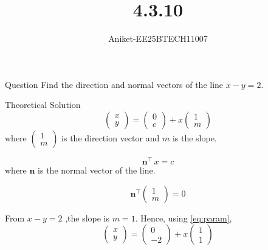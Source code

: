 \documentclass{beamer}
\title{4.3.10}
\author{Aniket-EE25BTECH11007}
\renewcommand{\vec}[1]{\mathbf{#1}}
\begin{document}
\frame{\titlepage}

\begin{frame}{Question}
Find the direction and normal vectors of the line \(x - y = 2\).
\end{frame}

\begin{frame}{Theoretical Solution}
\begin{equation}
\begin{pmatrix} x \\ y \end{pmatrix}
=
\begin{pmatrix} 0 \\ c \end{pmatrix}
+ x
\begin{pmatrix} 1 \\ m \end{pmatrix}
\label{eq:param}
\end{equation}
where $\begin{pmatrix} 1 \\ m \end{pmatrix}$ is the direction vector and $m$ is the slope.

\begin{equation}
\vec{n}^{\top}\,x = c
\label{eq:normal}
\end{equation}
where $\vec{n}$ is the normal vector of the line.

\begin{equation}
\vec{n}^{\top}
\begin{pmatrix} 1 \\ m \end{pmatrix}
= 0
\label{eq:orth}
\end{equation}

From $x - y = 2$ ,the slope is $m=1$. Hence, using \eqref{eq:param},
\begin{equation}
\begin{pmatrix} x \\ y \end{pmatrix}
=
\begin{pmatrix} 0 \\ -2 \end{pmatrix}
+ x
\begin{pmatrix} 1 \\ 1 \end{pmatrix}
\label{eq:param-inst}
\end{equation}
\end{frame}
\end{document}

